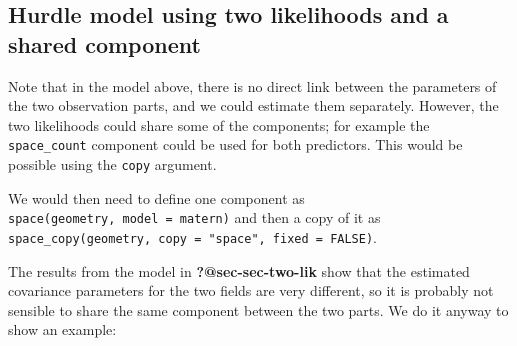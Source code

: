 \documentclass[
  letterpaper,
  DIV=11,
  numbers=noendperiod]{scrartcl}
\begin{document}
\subsection{Hurdle model using two likelihoods and a shared
component}\label{sec-two-lik-share}

Note that in the model above, there is no direct link between the
parameters of the two observation parts, and we could estimate them
separately. However, the two likelihoods could share some of the
components; for example the \texttt{space\_count} component could be
used for both predictors. This would be possible using the \texttt{copy}
argument.

We would then need to define one component as
\texttt{space(geometry,\ model\ =\ matern)} and then a copy of it as
\texttt{space\_copy(geometry,\ copy\ =\ "space",\ fixed\ =\ FALSE)}.

The results from the model in \textbf{?@sec-sec-two-lik} show that the
estimated covariance parameters for the two fields are very different,
so it is probably not sensible to share the same component between the
two parts. We do it anyway to show an example:
\end{document}

